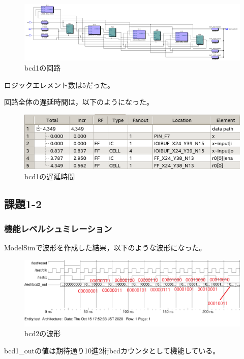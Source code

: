 \begin{figure}[H]
  \centering
  \includegraphics[width=\linewidth]{./src/bcd/bcd1surc.png}
  \caption{bcd1の回路}
\end{figure}

ロジックエレメント数は5だった。

回路全体の遅延時間は，以下のようになった。

\begin{figure}[H]
  \centering
  \includegraphics[width=\linewidth]{./src/bcd/bcd1timing.png}
  \caption{bcd1の遅延時間}
\end{figure}

\subsection*{課題1-2}
\subsubsection{機能レベルシュミレーション}
ModelSimで波形を作成した結果，以下のような波形になった。

\begin{figure}[H]
  \centering
  \includegraphics[width=\linewidth]{./src/bcd/bcd2wave.png}
  \caption{bcd2の波形}
  \label{bcd2の波形}
\end{figure}

bcd1\_outの値は期待通り10進2桁bcdカウンタとして機能している。

